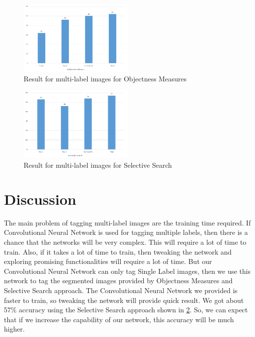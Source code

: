 \begin{figure}[h!]
  \centering
  \includegraphics[width=0.5\textwidth]{images/Capture3.PNG}
  \caption{Result for multi-label images for Objectness Measures}\label{finobj}
\end{figure}


\begin{figure}[h!]
  \centering
  \includegraphics[width=0.5\textwidth]{images/Capture4.PNG}
  \caption {Result for multi-label images for Selective Search}\label{finsel}
\end{figure}

\section{Discussion}

The main problem of tagging multi-label images are the training time required. If Convolutional Neural Network is used for tagging multiple labels, then there is a chance that the networks will be very complex. This will require a lot of time to train. Also, if it takes a lot of time to train, then tweaking the network and exploring promising functionalities will require a lot of time. But our Convolutional Neural Network can only tag Single Label images, then we use this network to tag the segmented images provided by Objectness Measures and Selective Search approach. The Convolutional Neural Network we provided is faster to train, so tweaking the network will provide quick result. We got about 57\% accuracy using the Selective Search approach shown in \ref{finsel}. So, we can expect that if we increase the capability of our network, this accuracy will be much higher.

